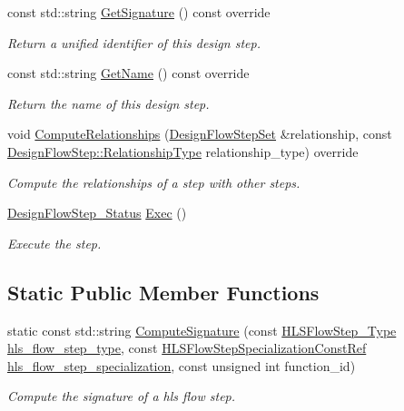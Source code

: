 \begin{DoxyCompactItemize}
const std\+::string \hyperlink{classHLSFunctionStep_a8f40b68d392790017292410850088887}{Get\+Signature} () const override
\begin{DoxyCompactList}\small\item\em Return a unified identifier of this design step. \end{DoxyCompactList}\item 
const std\+::string \hyperlink{classHLSFunctionStep_ab070622813a99accede9dd5f6ba5a3cb}{Get\+Name} () const override
\begin{DoxyCompactList}\small\item\em Return the name of this design step. \end{DoxyCompactList}\item 
void \hyperlink{classHLSFunctionStep_ab3864e8dbd73b0eabc25f386a0cece54}{Compute\+Relationships} (\hyperlink{classDesignFlowStepSet}{Design\+Flow\+Step\+Set} \&relationship, const \hyperlink{classDesignFlowStep_a723a3baf19ff2ceb77bc13e099d0b1b7}{Design\+Flow\+Step\+::\+Relationship\+Type} relationship\+\_\+type) override
\begin{DoxyCompactList}\small\item\em Compute the relationships of a step with other steps. \end{DoxyCompactList}\item 
\hyperlink{design__flow__step_8hpp_afb1f0d73069c26076b8d31dbc8ebecdf}{Design\+Flow\+Step\+\_\+\+Status} \hyperlink{classHLSFunctionStep_aa23c7b38f7775f2e11cee12a45173f95}{Exec} ()
\begin{DoxyCompactList}\small\item\em Execute the step. \end{DoxyCompactList}\end{DoxyCompactItemize}
\subsection*{Static Public Member Functions}
\begin{DoxyCompactItemize}
\item 
static const std\+::string \hyperlink{classHLSFunctionStep_ad9231528f2ec201d423ae69ac7db9719}{Compute\+Signature} (const \hyperlink{hls__step_8hpp_ada16bc22905016180e26fc7e39537f8d}{H\+L\+S\+Flow\+Step\+\_\+\+Type} \hyperlink{classHLS__step_aefd59af15346ec3f10bf12bd756e6777}{hls\+\_\+flow\+\_\+step\+\_\+type}, const \hyperlink{hls__step_8hpp_a5fdd2edf290c196531d21d68e13f0e74}{H\+L\+S\+Flow\+Step\+Specialization\+Const\+Ref} \hyperlink{classHLS__step_a843be75ba53b81876aa3c8b870ae8a55}{hls\+\_\+flow\+\_\+step\+\_\+specialization}, const unsigned int function\+\_\+id)
\begin{DoxyCompactList}\small\item\em Compute the signature of a hls flow step. \end{DoxyCompactList}\end{DoxyCompactItemize}
